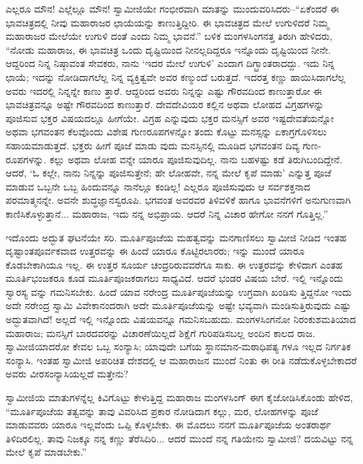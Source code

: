 ಎಲ್ಲರೂ ಮೌನ! ಎಲ್ಲೆಲ್ಲೂ ಮೌನ! ಸ್ವಾಮೀಜಿಯೇ ಗಂಭೀರವಾಗಿ ಮಾತನ್ನು ಮುಂದುವರಿಸಿದರು–“ಏಕೆಂದರೆ ಈ ಭಾವಚಿತ್ರದಲ್ಲಿ ನೀವು ಮಹಾರಾಜರ ಛಾಯೆಯನ್ನು ಕಾಣುತ್ತಿದ್ದೀರಿ. ಈ ಭಾವಚಿತ್ರದ ಮೇಲೆ ಉಗುಳಿದರೆ ನಿಮ್ಮ ಮಹಾರಾಜರ ಮೇಲೆಯೇ ಉಗುಳಿ ದಂತೆ ಎಂದು ನಿಮ್ಮ ಭಾವನೆ.” ಬಳಿಕ ಮಂಗಳಸಿಂಗನತ್ತ ತಿರುಗಿ ಹೇಳಿದರು, “ನೋಡು ಮಹಾರಾಜ, ಈ ಭಾವಚಿತ್ರ ಒಂದು ದೃಷ್ಟಿಯಿಂದ ನೀನಲ್ಲದಿದ್ದರೂ ಇನ್ನೊಂದು ದೃಷ್ಟಿಯಿಂದ ನೀನೇ. ಆದ್ದರಿಂದ ನಿನ್ನ ನಿಷ್ಠಾವಂತ ಸೇವಕರು, ನಾನು ‘ಇದರ ಮೇಲೆ ಉಗುಳಿ’ ಎಂದಾಗ ದಿಗ್ಭ್ರಾಂತರಾದದ್ದು. ಇದು ನಿನ್ನ ಛಾಯೆ; ಇದನ್ನು ನೋಡಿದಾಗಲೆಲ್ಲ ನಿನ್ನ ವ್ಯಕ್ತಿತ್ವವೇ ಅವರ ಕಣ್ಮುಂದೆ ಬರುತ್ತದೆ. ಇದರತ್ತ ಕಣ್ಣು ಹಾಯಿಸಿದಾಗಲೆಲ್ಲ ಅವರು ಇದರಲ್ಲಿ ನಿನ್ನನ್ನೇ ಕಾಣು ತ್ತಾರೆ. ಆದ್ದರಿಂದ ಅವರು ನಿನ್ನನ್ನು ಎಷ್ಟು ಗೌರವದಿಂದ ಕಾಣುತ್ತಾರೋ ಈ ಭಾವಚಿತ್ರವನ್ನೂ ಅಷ್ಟೇ ಗೌರವದಿಂದ ಕಾಣುತ್ತಾರೆ. ದೇವದೇವಿಯರ ಕಲ್ಲಿನ ಅಥವಾ ಲೋಹದ ವಿಗ್ರಹಗಳನ್ನು ಪೂಜಿಸುವ ಭಕ್ತರ ವಿಷಯದಲ್ಲೂ ಹೀಗೆಯೇ. ವಿಗ್ರಹ ಎನ್ನುವುದು ಭಕ್ತರ ಮನಸ್ಸಿಗೆ ಅವರ ಇಷ್ಟದೇವತೆಯನ್ನೋ ಅಥವಾ ಭಗವಂತನ ಕೆಲವೊಂದು ವಿಶೇಷ ಗುಣರೂಪಗಳನ್ನೋ ತಂದು ಕೊಟ್ಟು ಮನಸ್ಸನ್ನು ಏಕಾಗ್ರಗೊಳಿಸಲು ಸಹಾಯಮಾಡುತ್ತದೆ. ಭಕ್ತರು ಹೀಗೆ ಪೂಜೆ ಮಾಡು ವುದು ಮನಸ್ಸಿನಲ್ಲಿ ಮೂಡಿದ ಭಗವಂತನ ದಿವ್ಯ ಗುಣ-ರೂಪಗಳನ್ನು. ಕಲ್ಲು ಅಥವಾ ಲೋಹ ವನ್ನೇ ಯಾರೂ ಪೂಜಿಸುವುದಿಲ್ಲ. ನಾನು ಬಹಳಷ್ಟು ಕಡೆ ತಿರುಗಿಬಂದಿದ್ದೇನೆ. ಆದರೆ, ‘ಓ ಕಲ್ಲೇ, ನಾನು ನಿನ್ನನ್ನು ಪೂಜಿಸುತ್ತೇನೆ; ಹೇ ಲೋಹವೇ, ನನ್ನ ಮೇಲೆ ಕೃಪೆ ಮಾಡು’ ಎನ್ನುತ್ತ ಪೂಜೆ ಮಾಡುವ ಒಬ್ಬನೇ ಒಬ್ಬ ಹಿಂದುವನ್ನೂ ನಾನೆಲ್ಲೂ ಕಂಡಿಲ್ಲ! ಎಲ್ಲರೂ ಪೂಜಿಸುವುದು ಆ ಸರ್ವಶಕ್ತನಾದ ಪರಮಾತ್ಮನನ್ನೇ. ಅವನೇ ಶುದ್ಧಜ್ಞಾನಸ್ವರೂಪಿ. ಭಗವಂತ ಅವರವರ ತಿಳಿವಳಿಕೆ ಹಾಗೂ ಭಾವನೆಗಳಿಗೆ ಅನುಗುಣವಾಗಿ ಕಾಣಿಸಿಕೊಳ್ಳುತ್ತಾನೆ... ಮಹಾರಾಜ, ಇದು ನನ್ನ ಅಭಿಪ್ರಾಯ. ಆದರೆ ನಿನ್ನ ವಿಚಾರ ಹೇಗೋ ನನಗೆ ಗೊತ್ತಿಲ್ಲ.”

ಇದೊಂದು ಅದ್ಭುತ ಘಟನೆಯೇ ಸರಿ. ಮೂರ್ತಿಪೂಜೆಯ ಮಹತ್ವವನ್ನು ಮನಗಾಣಿಸಲು ಸ್ವಾಮೀಜಿ ನೀಡಿದ ಇಂತಹ ದೃಷ್ಟಾಂತಪೂರ್ವಕವಾದ ಉತ್ತರವನ್ನು ಈ ಹಿಂದೆ ಯಾರೂ ಕೊಟ್ಟಿರಲಾರರು; ಇನ್ನು ಮುಂದೆ ಯಾರೂ ಕೊಡಬೇಕಾಗಿಯೂ ಇಲ್ಲ. ಈ ಉತ್ತರ ಸೂರ್ಯ ಚಂದ್ರರಿರುವವರೆಗೂ ಸಾಕು. ಈ ಉತ್ತರವನ್ನು ಕೇಳಿದಾಗ ಎಂತಹ ಮೂರ್ತಿಭಂಜಕರೂ ಕೂಡ ಮೂರ್ತಿಪೂಜಕರಾಗಲು ಸಾಧ್ಯವಿದೆ. ಆದರೆ ಭಂಡರ ವಿಷಯ ಬೇರೆ. ಇಲ್ಲಿ ಇನ್ನೊಂದು ಸ್ವಾರಸ್ಯ ವನ್ನು ಗಮನಿಸಬೇಕು. ಹಿಂದೆ ಯಾವ ನರೇಂದ್ರ ಮೂರ್ತಿಪೂಜೆಯನ್ನು ಉಗ್ರವಾಗಿ ಖಂಡಿಸು ತ್ತಿದ್ದನೋ ಇಂದು ಅದೇ ನರೇಂದ್ರ ಸ್ವಾಮಿ ವಿವೇಕಾನಂದರಾಗಿ ಅದೇ ಮೂರ್ತಿಪೂಜೆಯನ್ನು ಅಷ್ಟೇ ಭವ್ಯವಾಗಿ ಮಂಡಿಸುತ್ತಿರುವುದು ಎಷ್ಟು ಅದ್ಭುತವಾಗಿದೆ! ಅಲ್ಲದೆ ಇಲ್ಲಿ ಇನ್ನೊಂದು ವಿಷಯವನ್ನೂ ಗಮನಿಸಬಹುದು. ಮಂಗಳಸಿಂಗನೋ ನಿರಂಕುಶಮತಿಯಾದ ಮಹಾರಾಜ; ಮನಸ್ಸಿಗೆ ಬಾರದವರನ್ನು ವಿಚಾರಣೆಯಿಲ್ಲದೆ ಶಿಕ್ಷೆಗೆ ಗುರಿಪಡಿಸಬಲ್ಲ ಅಂದಿನ ಕಾಲದ ರಾಜ. ಸ್ವಾಮೀಜಿಯಾದರೋ ಕೇವಲ ಒಬ್ಬ ಸಂನ್ಯಾಸಿ; ಯಾವುದೇ ಬಗೆಯ ಸ್ಥಾನಮಾನ-ಮಠಾಧಿಪತ್ಯ ಗಳೂ ಇಲ್ಲದ ನಿರ್ಗತಿಕ ಸಂನ್ಯಾಸಿ. ಇಂತಹ ಸ್ವಾಮೀಜಿ ಅಪರಿಚಿತ ದೇಶದಲ್ಲಿ ಆ ಮಹಾರಾಜನ ಮುಂದೆ ನಿಂತು ಈ ರೀತಿ ನಡೆದುಕೊಳ್ಳಬೇಕಾದರೆ ಅವರು ವೀರಸಂನ್ಯಾಸಿಯಲ್ಲದೆ ಮತ್ತೇನು?

ಸ್ವಾಮೀಜಿಯ ಮಾತುಗಳನ್ನೆಲ್ಲ ಕಿವಿಗೊಟ್ಟು ಕೇಳುತ್ತಿದ್ದ ಮಹಾರಾಜ ಮಂಗಳಸಿಂಗ್ ಈಗ ಕೈಜೋಡಿಸಿಕೊಂಡು ಹೇಳಿದ, “ಮೂರ್ತಿಪೂಜೆಯ ತತ್ವವನ್ನು ತಾವು ವಿವರಿಸಿದ ಪ್ರಕಾರ ನೋಡಿದಾಗ ಕಲ್ಲು, ಮರ, ಲೋಹಗಳನ್ನು ಪೂಜೆ ಮಾಡುವವರು ಯಾರೂ ಇಲ್ಲವೆಂದು ಒಪ್ಪಿ ಕೊಳ್ಳಬೇಕು. ಈ ಮೊದಲು ನನಗೆ ಮೂರ್ತಿಪೂಜೆಯ ಅಂತರಾರ್ಥ ತಿಳಿದಿರಲಿಲ್ಲ. ತಾವು ನಿಜಕ್ಕೂ ನನ್ನ ಕಣ್ಣು ತೆರೆಸಿದಿರಿ... ಆದರೆ ಮುಂದೆ ನನ್ನ ಗತಿಯೇನು ಸ್ವಾಮೀಜಿ? ದಯವಿಟ್ಟು ನನ್ನ ಮೇಲೆ ಕೃಪೆ ಮಾಡಬೇಕು.”

